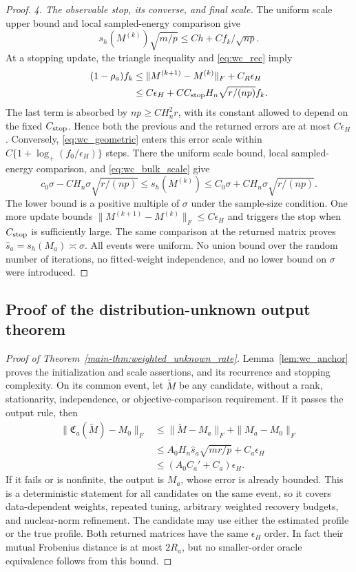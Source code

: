 \documentclass[numsec,webpdf,modern,large,namedate]{oup-authoring-template}
\theoremstyle{plain}
\theoremstyle{remark}
\newif\ifmarkchanges
\newenvironment{revision}{\begingroup\ifmarkchanges\color{red}\fi}{\endgroup}
\begin{document}
\begin{revision}
\begin{proof}
\textit{4. The observable stop, its converse, and final scale.}
The uniform scale upper bound and local sampled-energy comparison give
\[
 s_h(M^{(k)})\sqrt{m/p}\le Ch+Cf_k/\sqrt{np}.
\]
At a stopping update, the triangle inequality and \eqref{eq:wc_rec} imply
\begin{align*}
 (1-\rho_a)f_k
 &\le\|M^{(k+1)}-M^{(k)}\|_F+C_R\epsilon_H\\
 &\le C\epsilon_H+
 C C_{\rm stop}H_n\sqrt{r/(np)}f_k.
\end{align*}
The last term is absorbed by $np\ge C H_n^2r$, with its constant allowed
to depend on the fixed $C_{\rm stop}$. Hence both the previous and the
returned errors are at most $C\epsilon_H$.
Conversely, \eqref{eq:wc_geometric} enters this error scale within
$C\{1+\log_+(f_0/\epsilon_H)\}$ steps. There the uniform scale bound,
local sampled-energy comparison, and \eqref{eq:wc_bulk_scale} give
\[
 c_0\sigma-C H_n\sigma\sqrt{r/(np)}
 \le s_h(M^{(k)})
 \le C_0\sigma+C H_n\sigma\sqrt{r/(np)}.
\]
The lower bound is a positive multiple of $\sigma$ under the sample-size
condition. One more update bounds
$\|M^{(k+1)}-M^{(k)}\|_F\le C\epsilon_H$ and triggers the stop when
$C_{\rm stop}$ is sufficiently large. The same comparison at the returned
matrix proves $\widehat s_a=s_h(M_a)\asymp\sigma$.
All events were uniform. No union bound over the random number of
iterations, no fitted-weight independence, and no lower bound on
$\sigma$ were introduced.
\end{proof}

\subsection{Proof of the distribution-unknown output theorem}
\begin{proof}[Proof of Theorem~\ref{main-thm:weighted_unknown_rate}]
Lemma~\ref{lem:wc_anchor} proves the initialization and scale assertions,
and its recurrence and stopping complexity.
On its common event, let $\widetilde M$ be any candidate, without a rank,
stationarity, independence, or objective-comparison requirement. If it
passes the output rule, then
\begin{align*}
 \|\mathfrak C_a(\widetilde M)-M_0\|_F
 &\le\|\widetilde M-M_a\|_F+\|M_a-M_0\|_F\\
 &\le A_0H_n\widehat s_a\sqrt{mr/p}+C_a\epsilon_H\\
 &\le(A_0C_a'+C_a)\epsilon_H.
\end{align*}
If it fails or is nonfinite, the output is $M_a$, whose error is already
bounded. This is a deterministic statement for all candidates on the
same event, so it covers data-dependent weights, repeated tuning,
arbitrary weighted recovery budgets, and nuclear-norm refinement.
The candidate may use either the estimated profile or the true profile.
Both returned matrices have the same $\epsilon_H$ order. In fact their
mutual Frobenius distance is at most $2R_a$, but no smaller-order
oracle equivalence follows from this bound.


\end{proof}
\end{revision}
\end{document}
